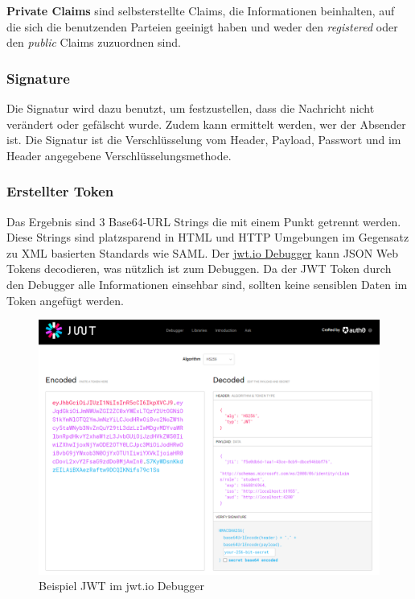 \textbf{Private Claims} sind selbsterstellte Claims, die Informationen beinhalten, auf die sich die benutzenden Parteien geeinigt haben und weder den \textit{registered} 
oder den \textit{public} Claims zuzuordnen sind.

\subsubsection{Signature}
Die Signatur wird dazu benutzt, um festzustellen, dass die Nachricht nicht verändert oder gefälscht wurde. Zudem kann ermittelt werden, wer der Absender ist. 
Die Signatur ist die Verschlüsselung vom Header, Payload, Passwort und im Header angegebene Verschlüsselungsmethode.

\subsubsection{Erstellter Token}
Das Ergebnis sind 3 Base64-URL Strings die mit einem Punkt getrennt werden. Diese Strings sind platzsparend in HTML und HTTP Umgebungen im Gegensatz zu XML basierten Standards wie SAML. 
Der \href{https://jwt.io/#debugger-io}{jwt.io Debugger} kann JSON Web Tokens decodieren, was nützlich ist zum Debuggen. Da der JWT Token durch den Debugger alle Informationen einsehbar sind, 
sollten keine sensiblen Daten im Token angefügt werden.

\begin{figure}[h]
    \begin{center}
        \includegraphics*[width=15cm]{./pics/screenshot-JWT-token1.png}
        \caption[Bsp JWT in Debugger]{Beispiel JWT im jwt.io Debugger}
    \end{center}
\end{figure}

